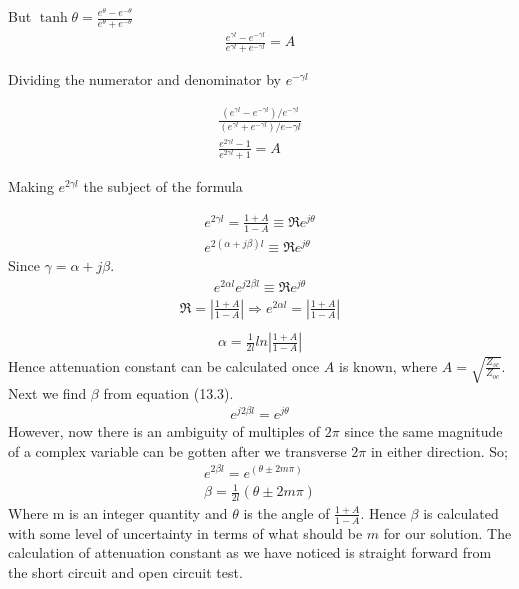But $\tanh \theta = \frac{e^\theta - e^{-\theta}}{e^\theta + e^{-\theta}}$
\begin{align*}
\frac{e^{\gamma l} - e^{-\gamma l}}{e^{\gamma l} + e^{-\gamma l}} = A
\end{align*}
\begin{center}
Dividing the numerator and denominator by $e^{-\gamma l}$
\end{center}
\begin{align*}
\frac{(e^{\gamma l} - e^{-\gamma l})/e^{-\gamma l}}{(e^{\gamma l} + e^{-\gamma l})/e{-\gamma l}}\\
\frac{e^{2\gamma l} - 1}{e^{2\gamma l} + 1} = A
\end{align*}
\begin{center}
Making $e^{2\gamma l}$ the subject of the formula
\end{center}
\begin{align*}
e^{2\gamma l} = \frac{1 +A}{1 - A}\equiv \Re e^{j\theta}\\
e^{2(\alpha + j\beta)l} \equiv \Re e^{j\theta}
\end{align*}
Since $\gamma = \alpha + j\beta$.
\begin{align}
e^{2\alpha l}e^{j2\beta l} \equiv \Re e^{j\theta}
\end{align}
\begin{align*}
\Re = |\frac{1 + A}{1 - A}| \Rightarrow e^{2\alpha l} = |\frac{1 + A}{1 - A}|\\
\end{align*}
\begin{align}
\alpha = \frac{1}{2l}ln|\frac{1 + A}{1 - A}|
\end{align}
Hence attenuation constant can be calculated once $A$ is known, where $A = \sqrt{\frac{Z_{sc}}{Z_{oc}}}$. Next we find $\beta$ from equation (13.3).
\begin{align*}
e^{j2\beta l} = e^{j\theta}
\end{align*}
However, now there is an ambiguity of multiples of $2\pi$ since the same magnitude of a complex variable can be gotten after we transverse $2\pi$ in either direction. So;
\begin{align*}
e^{2\beta l} = e^{(\theta \pm 2m\pi)}\\
\beta = \frac{1}{2l} (\theta \pm 2m\pi)
\end{align*}
Where m is an integer quantity and $\theta$ is the angle of $\frac{1 + A}{1 - A}$. Hence $\beta$ is calculated with some level of uncertainty in terms of what should be $m$ for our solution. The calculation of attenuation constant as we have noticed is straight forward from the short circuit and open circuit test.

